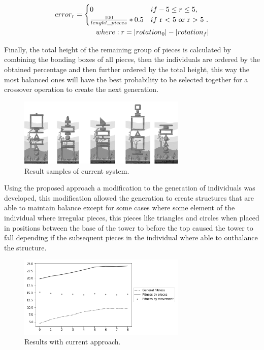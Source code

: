 \documentclass[graybox]{svmult}
\begin{document}
\begin{equation}
    \begin{aligned}
    error_{r} = 
        \begin{cases}
            0 & if -5 \le r \le 5, \\
            \frac{100}{lenght\_pieces} * 0.5 & if $ r < 5 or r > 5 $.
        \end{cases} \\
    where: r= |rotation_0| - |rotation_f|   
    \end{aligned}
\end{equation}



Finally, the total height of the remaining group of pieces is calculated by combining the bonding boxes of all pieces, then the individuals are ordered by the obtained percentage and then further ordered by the total height, this way the most balanced ones will have the best probability to be selected together for a crossover operation to create the next generation.

\begin{figure}[htbp]
\centerline{\includegraphics[width=80mm]{Images/result_example.png}}
\caption{Result samples of current system.}
\label{fig}
\end{figure}

Using the proposed approach a modification to the generation of individuals was developed, this modification allowed the generation to create structures that are able to maintain balance except for some cases where some element of the individual where irregular pieces, this pieces like triangles and circles when placed in positions between the base of the tower to before the top caused the tower to fall depending if the subsequent pieces in the individual where able to outbalance the structure.

\begin{figure}[htbp]
    \centerline{\includegraphics[width=80mm]{Images/results_v1.png}}
    \caption{Results with current approach.}
    \label{fig}
    \end{figure}
\end{document}
